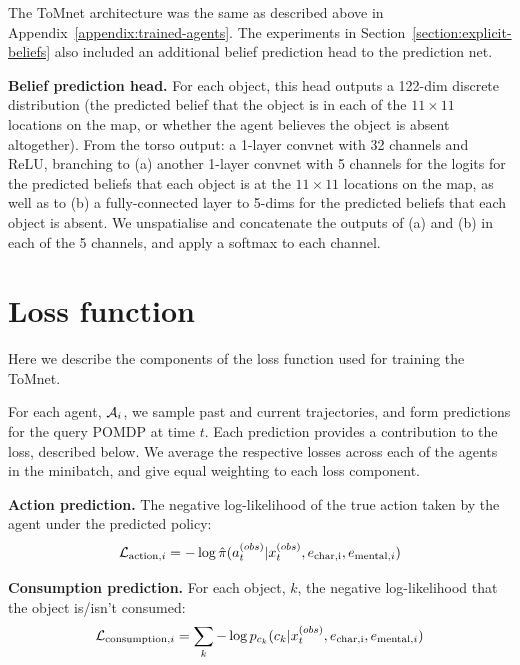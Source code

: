\documentclass{article}
\begin{document}
The ToMnet architecture was the same as described above in Appendix~\ref{appendix:trained-agents}. The experiments in Section~\ref{section:explicit-beliefs} also included an additional belief prediction head to the prediction net.

{\bf Belief prediction head.} For each object, this head outputs a 122-dim discrete distribution (the predicted belief that the object is in each of the $11 \times 11$ locations on the map, or whether the agent believes the object is absent altogether). From the torso output: a 1-layer convnet with 32 channels and ReLU, branching to (a) another 1-layer convnet with 5 channels for the logits for the predicted beliefs that each object is at the $11\times11$ locations on the map, as well as to (b) a fully-connected layer to 5-dims for the predicted beliefs that each object is absent. We unspatialise and concatenate the outputs of (a) and (b) in each of the 5 channels, and apply a softmax to each channel.


\newpage
\section{Loss function}
\label{appendix:loss}

Here we describe the components of the loss function used for training the ToMnet.

For each agent, $\mathcal{A}_i$, we sample past and current trajectories, and form predictions for the query POMDP at time $t$. Each prediction provides a contribution to the loss, described below. We average the respective losses across each of the agents in the minibatch, and give equal weighting to each loss component.

{\bf Action prediction.} The negative log-likelihood of the true action taken by the agent under the predicted policy:
\begin{equation*}
\mathcal{L}_{\mathrm{action}, i} = -\log \hat{\pi}(a_t^{(obs)} | x_t^{(obs)}, e_{\mathrm{char,i}}, e_{\mathrm{mental},i})
\end{equation*}

{\bf Consumption prediction.} For each object, $k$, the negative log-likelihood that the object is/isn't consumed: 
\begin{equation*}
\mathcal{L}_{\mathrm{consumption}, i} = \sum_k -\log p_{c_k}(c_k | x_t^{(obs)}, e_{\mathrm{char,i}}, e_{\mathrm{mental},i})
\end{equation*}
\end{document}
